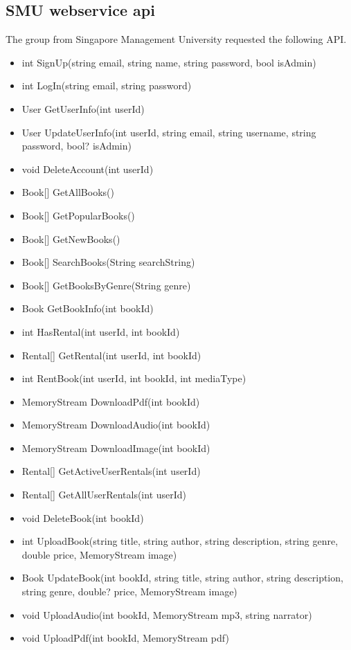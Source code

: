 \documentclass[a4paper,11pt,report]{article}
\begin{document}
\subsection{SMU webservice api}
The group from Singapore Management University requested the following API.

\begin{itemize}
	\item int SignUp(string email, string name, string password, bool isAdmin)
	\item int LogIn(string email, string password)
	\item User GetUserInfo(int userId)
	\item User UpdateUserInfo(int userId, string email, string username, string password, bool? isAdmin)
	\item void DeleteAccount(int userId)
	\item Book[] GetAllBooks()
	\item Book[] GetPopularBooks()
	\item Book[] GetNewBooks()
	\item Book[] SearchBooks(String searchString)
	\item Book[] GetBooksByGenre(String genre)
	\item Book GetBookInfo(int bookId)
	\item int HasRental(int userId, int bookId)
	\item Rental[] GetRental(int userId, int bookId)
	\item int RentBook(int userId, int bookId, int mediaType)
	\item MemoryStream DownloadPdf(int bookId)
	\item MemoryStream DownloadAudio(int bookId)
	\item MemoryStream DownloadImage(int bookId)
	\item Rental[] GetActiveUserRentals(int userId)
	\item Rental[] GetAllUserRentals(int userId)
	\item void DeleteBook(int bookId)
	\item int UploadBook(string title, string author, string description, string genre, double price, MemoryStream image)
	\item Book UpdateBook(int bookId, string title, string author, string description, string genre, double? price, MemoryStream image)
	\item void UploadAudio(int bookId, MemoryStream mp3, string narrator)
	\item void UploadPdf(int bookId, MemoryStream pdf)
\end{itemize}
\end{document}
